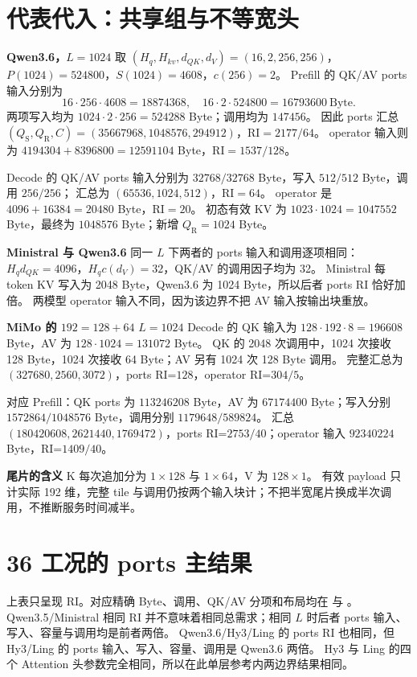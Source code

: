 \documentclass[UTF8,a4paper,11pt]{ctexart}
\newcommand{\qs}{{Q_{\mathrm S}}}\newcommand{\qr}{{Q_{\mathrm R}}}\newcommand{\ri}{\mathrm{RI}}
\newcommand{\para}[1]{\par\textbf{#1}\quad}
\begin{document}
\clearpage
\section{代表代入：共享组与不等宽头}
\para{Qwen3.6，$L=1024$} 取 $(H_q,H_{kv},d_{QK},d_V)=(16,2,256,256)$，
$P(1024)=524800$，$S(1024)=4608$，$c(256)=2$。
Prefill 的 QK/AV ports 输入分别为
\[
16\cdot256\cdot4608=18874368,\quad
16\cdot2\cdot524800=16793600\ \mathrm{Byte}.
\]
两项写入均为 $1024\cdot2\cdot256=524288$ Byte；调用均为 $147456$。
因此 ports 汇总 $(\qs,\qr,C)=(35667968,1048576,294912)$，$\ri=2177/64$。
operator 输入则为 $4194304+8396800=12591104$ Byte，$\ri=1537/128$。

Decode 的 QK/AV ports 输入分别为 $32768/32768$ Byte，写入 $512/512$ Byte，调用 $256/256$；
汇总为 $(65536,1024,512)$，$\ri=64$。
operator 是 $4096+16384=20480$ Byte，$\ri=20$。
初态有效 KV 为 $1023\cdot1024=1047552$ Byte，最终为 $1048576$ Byte；新增 $\qr=1024$ Byte。

\para{Ministral 与 Qwen3.6} 同一 $L$ 下两者的 ports 输入和调用逐项相同：
$H_qd_{QK}=4096$，$H_qc(d_V)=32$，QK/AV 的调用因子均为 32。
Ministral 每 token KV 写入为 2048 Byte，Qwen3.6 为 1024 Byte，所以后者 ports RI 恰好加倍。
两模型 operator 输入不同，因为该边界不把 AV 输入按输出块重放。

\para{MiMo 的 $192=128+64$} $L=1024$ Decode 的 QK 输入为
$128\cdot192\cdot8=196608$ Byte，AV 为 $128\cdot1024=131072$ Byte。
QK 的 2048 次调用中，1024 次接收 128 Byte，1024 次接收 64 Byte；AV 另有 1024 次 128 Byte 调用。
完整汇总为 $(327680,2560,3072)$，ports RI=$128$，operator RI=$304/5$。

对应 Prefill：QK ports 为 $113246208$ Byte，AV 为 $67174400$ Byte；写入分别 $1572864/1048576$ Byte，调用分别 $1179648/589824$。
汇总 $(180420608,2621440,1769472)$，ports RI=$2753/40$；operator 输入 $92340224$ Byte，RI=$1409/40$。

\para{尾片的含义} K 每次追加分为 $1\times128$ 与 $1\times64$，V 为 $128\times1$。
有效 payload 只计实际 192 维，完整 tile 与调用仍按两个输入块计；不把半宽尾片换成半次调用，不推断服务时间减半。

\clearpage
\section{36 工况的 ports 主结果}
\begin{center}\small\setlength{\tabcolsep}{12pt}\end{center}
上表只呈现 RI。对应精确 Byte、调用、QK/AV 分项和布局均在  与 。
Qwen3.5/Ministral 相同 RI 并不意味着相同总需求；相同 $L$ 时后者 ports 输入、写入、容量与调用均是前者两倍。
Qwen3.6/Hy3/Ling 的 ports RI 也相同，但 Hy3/Ling 的 ports 输入、写入、容量、调用是 Qwen3.6 两倍。
Hy3 与 Ling 的四个 Attention 头参数完全相同，所以在此单层参考内两边界结果相同。
\end{document}
